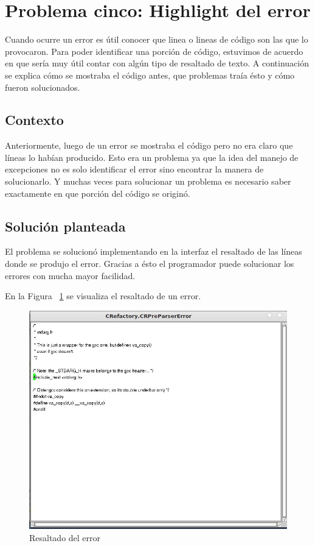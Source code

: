 \documentclass[a4paper,oneside,12pt]{article}
\begin{document}
\section{Problema cinco: Highlight del error}

Cuando ocurre un error es \'util conocer que linea o lineas de c\'odigo son las que lo provocaron. Para poder identificar una porci\'on de c\'odigo, estuvimos de acuerdo en que ser\'ia muy \'util contar con alg\'un tipo de resaltado de texto. A continuaci\'on se explica c\'omo se mostraba el c\'odigo antes, que problemas tra\'ia \'esto y c\'omo fueron solucionados.

\subsection{Contexto}
Anteriormente, luego de un error se mostraba el c\'odigo pero no era claro que l\'ineas lo hab\'ian producido. Esto era un problema ya que la idea del manejo de excepciones no es solo identificar el error sino encontrar la manera de solucionarlo. Y muchas veces para solucionar un problema es necesario saber exactamente en que porci\'on del c\'odigo se origin\'o.

\subsection{Soluci\'on planteada}
El problema se solucion\'o implementando en la interfaz el resaltado de las l\'ineas donde se produjo el error. Gracias a \'esto el programador puede solucionar los errores con mucha mayor facilidad.

En la Figura ~\ref{resaltado} se visualiza el resaltado de un error.
\begin{figure}[h!]
  \centering
    \includegraphics[scale=0.50]{images/codigo_modificado/highlight_preparser.jpg}
     \caption{Resaltado del error}
     \label{resaltado}
\end{figure}
\end{document}

